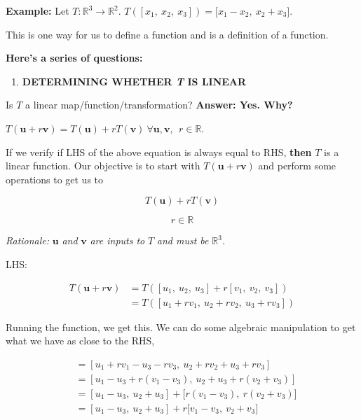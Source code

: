 \documentclass[
]{article}
\begin{document}
\textbf{Example:} Let $T:\mathbb{R}^{3} \rightarrow \mathbb{R}^{2}$.
$T\left( \left\lbrack x_{1},\ x_{2},\ x_{3} \right\rbrack \right) = \lbrack x_{1} - x_{2},\ x_{2} + x_{3}\rbrack$.

This is one way for us to define a function and is a definition of a
function.

\textbf{Here's a series of questions:}

\begin{enumerate}
\def\labelenumi{\arabic{enumi}.}
\item
  \textbf{DETERMINING WHETHER \emph{T} IS LINEAR}
\end{enumerate}

Is $T$ a linear map/function/transformation? \textbf{Answer: Yes.
Why?}

$T\left( \mathbf{u} + r\mathbf{v} \right) = T\left( \mathbf{u} \right) + rT\left( \mathbf{v} \right)\ \forall\mathbf{u},\mathbf{v},\ \ r\mathbb{\in R}$.

If we verify if LHS of the above equation is always equal to RHS,
\textbf{then} $T$ is a linear function. Our objective is to start with
$T(\mathbf{u} + r\mathbf{v})$ and perform some operations to
get us to

$$T\left( \mathbf{u} \right) + rT(\mathbf{v})
$$

$$r\mathbb{\in R}$$

\emph{Rationale:} $\mathbf{u}$ \emph{and} $\mathbf{v}$
\emph{are inputs to} $T$ \emph{and must be} $\mathbb{R}^{3}$\emph{.}

LHS:

\begin{align*}
T\left( \mathbf{u} + r\mathbf{v} \right) &= T\left( \left\lbrack u_{1},\ u_{2},\ u_{3} \right\rbrack + r\left\lbrack v_{1},\ v_{2},\ v_{3} \right\rbrack \right)
 \\
&= T\left( \left\lbrack u_{1} + rv_{1},\ u_{2} + rv_{2},\ u_{3} + rv_{3} \right\rbrack \right)
\end{align*}


Running the function, we get this. We can do some algebraic manipulation
to get what we have as close to the RHS,

\begin{align*}
&= \left\lbrack u_{1} + rv_{1} - u_{3} - rv_{3},\ u_{2} + rv_{2} + u_{3} + rv_{3} \right\rbrack
 \\
&= \left\lbrack u_{1} - u_{3} + r\left( v_{1} - v_{3} \right),\ u_{2} + u_{3} + r\left( v_{2} + v_{3} \right) \right\rbrack
 \\
&= \left\lbrack u_{1} - u_{3},\ u_{2} + u_{3} \right\rbrack + \lbrack r\left( v_{1} - v_{3} \right),\ r\left( v_{2} + v_{3} \right)\rbrack
 \\
&= \left\lbrack u_{1} - u_{3},\ u_{2} + u_{3} \right\rbrack + r\lbrack v_{1} - v_{3},\ v_{2} + v_{3}\rbrack
\end{align*}
\end{document}
